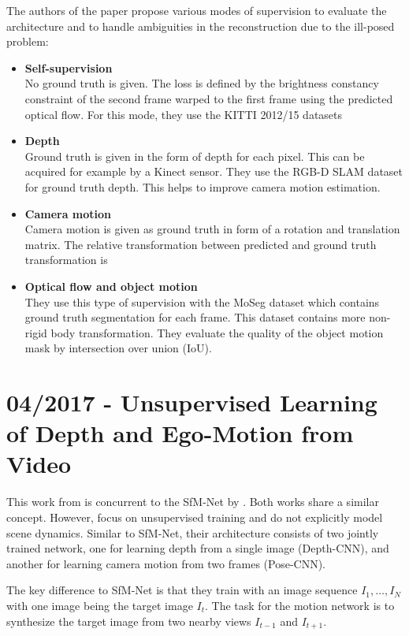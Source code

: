 		The authors of the paper propose various modes of supervision to evaluate the architecture and to handle ambiguities in the reconstruction due to the ill-posed problem:
		\begin{itemize}
		\item \textbf{Self-supervision}
			\\
			No ground truth is given.
			The loss is defined by the brightness constancy constraint of the second frame warped to the first frame using the predicted optical flow.
			For this mode, they use the {KITTI} 2012/15 datasets
		\item \textbf{Depth}
			\\
			Ground truth is given in the form of depth for each pixel.
			This can be acquired for example by a Kinect sensor.
			They use the {RGB-D SLAM} dataset for ground truth depth.
			This helps to improve camera motion estimation. 
		\item \textbf{Camera motion}
			\\
			Camera motion is given as ground truth in form of a rotation and translation matrix.
			The relative transformation between predicted and ground truth transformation is 
		\item \textbf{Optical flow and object motion}
			\\
			They use this type of supervision with the MoSeg dataset which contains ground truth segmentation for each frame.
			This dataset contains more non-rigid body transformation.
			They evaluate the quality of the object motion mask by intersection over union (IoU).
		\end{itemize}
		
	\section{04/2017 - Unsupervised Learning of Depth and Ego-Motion from Video}
		
		This work from \cite{zhou2017unsupervised} is concurrent to the SfM-Net by \cite{SFMNET}.
		Both works share a similar concept.
		However, \cite{zhou2017unsupervised} focus on unsupervised training and do not explicitly model scene dynamics.
		Similar to SfM-Net, their architecture consists of two jointly trained network, one for learning depth from a single image (Depth-CNN), and another for learning camera motion from two frames (Pose-CNN).
		
		The key difference to SfM-Net is that they train with an image sequence $I_1, \dots, I_N$ with one image being the target image $I_t$.
		The task for the motion network is to synthesize the target image from two nearby views $I_{t - 1}$ and $I_{t + 1}$.
		
